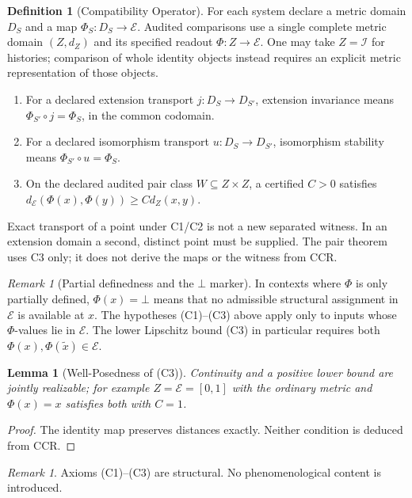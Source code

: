\documentclass[11pt,a4paper]{article}
\theoremstyle{plain}
\newtheorem{lemma}[theorem]{Lemma}
\theoremstyle{definition}
\newtheorem{definition}[theorem]{Definition}
\theoremstyle{remark}
\newtheorem{remark}[theorem]{Remark}
\newcommand{\I}{\mathcal{I}}
\newcommand{\E}{\mathcal{E}}
\newcommand{\dE}{d_{\mathcal{E}}}
\begin{document}
\begin{definition}[Compatibility Operator]\label{def:compat}
For each system declare a metric domain $D_S$ and a map $\Phi_S:D_S\to\E$. Audited comparisons use a single complete metric domain $(Z,d_Z)$ and its specified readout $\Phi:Z\to\E$. One may take $Z=\I$ for histories; comparison of whole identity objects instead requires an explicit metric representation of those objects.
\begin{enumerate}
\item[(C1)] For a declared extension transport $j:D_S\to D_{S'}$, extension invariance means $\Phi_{S'}\circ j=\Phi_S$, in the common codomain.
\item[(C2)] For a declared isomorphism transport $u:D_S\to D_{S'}$, isomorphism stability means $\Phi_{S'}\circ u=\Phi_S$.
\item[(C3)] On the declared audited pair class $W\subseteq Z\times Z$, a certified $C>0$ satisfies $\dE(\Phi(x),\Phi(y))\geq C d_Z(x,y)$.
\end{enumerate}
Exact transport of a point under C1/C2 is not a new separated witness. In an extension domain a second, distinct point must be supplied. The pair theorem uses C3 only; it does not derive the maps or the witness from CCR.
\end{definition}

\begin{remark}[Partial definedness and the $\bot$ marker]\label{rem:partial-phi}
In contexts where $\Phi$ is only partially defined, $\Phi(x)=\bot$ means that no admissible structural assignment in $\E$ is available at $x$. The hypotheses (C1)--(C3) above apply only to inputs whose $\Phi$-values lie in $\E$. The lower Lipschitz bound (C3) in particular requires both $\Phi(x),\Phi(\tilde{x})\in\E$.
\end{remark}

\begin{lemma}[Well-Posedness of (C3)]
Continuity and a positive lower bound are jointly realizable; for example $Z=\E=[0,1]$ with the ordinary metric and $\Phi(x)=x$ satisfies both with $C=1$.
\end{lemma}

\begin{proof}
The identity map preserves distances exactly. Neither condition is deduced from CCR.
\end{proof}

\begin{remark}
Axioms (C1)--(C3) are structural. No phenomenological content is introduced.
\end{remark}
\end{document}
